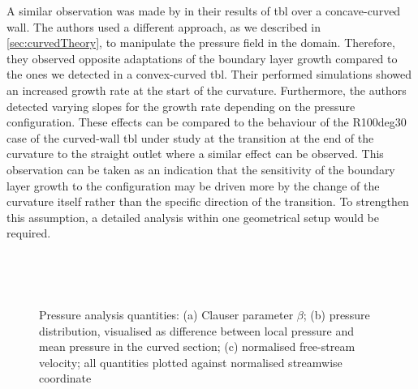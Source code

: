 A similar observation was made by \citet{appelbaum_systematic_2025} in their results of \acrshort{tbl} over a concave-curved wall.
The authors used a different approach, as we described in \autoref{sec:curvedTheory}, to manipulate the pressure field in the domain.
Therefore, they observed opposite adaptations of the boundary layer growth compared to the ones we detected in a convex-curved \acrshort{tbl}. 
Their performed simulations showed an increased growth rate at the start of the curvature. 
Furthermore, the authors detected varying slopes for the growth rate depending on the pressure configuration.
These effects can be compared to the behaviour of the R100deg30 case of the curved-wall \acrshort{tbl} under study at the transition at the end of the curvature to the straight outlet where a similar effect can be observed.
This observation can be taken as an indication that the sensitivity of the boundary layer growth to the configuration may be driven more by the change of the curvature itself rather than the specific direction of the transition. 
To strengthen this assumption, a detailed analysis within one geometrical setup would be required.

\begin{figure}[h!]
\centering\begin{subfigure}[t]{0.495\textwidth}
    \centering
    \subcaption{}
    
    \label{fig:R100deg30Re1200Beta}
\end{subfigure}
\hfill
\begin{subfigure}[t]{0.495\textwidth}
    \subcaption{}
    \centering
    
    \label{fig:R100deg30Re1200p}
\end{subfigure}
\\[-20pt]
\begin{subfigure}[t]{0.495\textwidth}
    \centering
    \subcaption{}
    
    \label{fig:R100deg30Re1200Uinf}
\end{subfigure}
\\[-15pt]
\caption{Pressure analysis quantities: (a) Clauser parameter $\beta$; (b) pressure distribution, visualised as difference between local pressure and mean pressure in the curved section; (c) normalised free-stream velocity; all quantities plotted against normalised streamwise coordinate}
\label{fig:R100deg30Re1200Prelated}
\end{figure}

